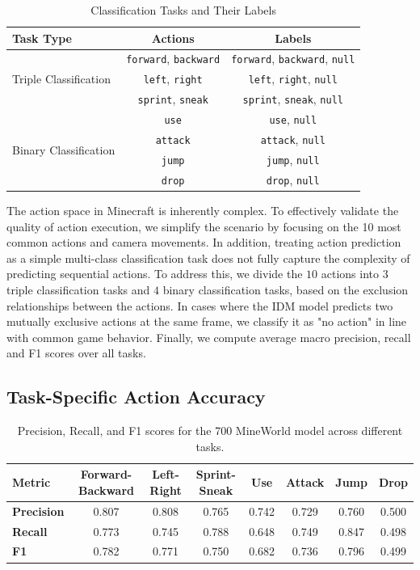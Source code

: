 \documentclass{article} %
\begin{document}
\begin{table}[htbp]
\centering
\caption{Classification Tasks and Their Labels}
\begin{tabular}{ l|c|c }
\toprule[1pt]
\textbf{Task Type} & \textbf{Actions} & \textbf{Labels} \\
\midrule
\multirow{3}{*}{Triple Classification} & \texttt{forward}, \texttt{backward} & \texttt{forward}, \texttt{backward}, \texttt{null} \\
& \texttt{left}, \texttt{right} & \texttt{left}, \texttt{right}, \texttt{null} \\
& \texttt{sprint}, \texttt{sneak} & \texttt{sprint}, \texttt{sneak}, \texttt{null} \\
\midrule
\multirow{4}{*}{Binary Classification} & \texttt{use} & \texttt{use}, \texttt{null} \\
& \texttt{attack} & \texttt{attack}, \texttt{null} \\
& \texttt{jump} & \texttt{jump}, \texttt{null} \\
& \texttt{drop} & \texttt{drop}, \texttt{null} \\
\bottomrule
\end{tabular}
\label{tab:subtask}
\end{table}

The action space in Minecraft is inherently complex. To effectively validate the quality of action execution, we simplify the scenario by focusing on the 10 most common actions and camera movements.
In addition, treating action prediction as a simple multi-class classification task does not fully capture the complexity of predicting sequential actions. To address this, we divide the $10$ actions into $3$ triple classification tasks and $4$ binary classification tasks, based on the exclusion relationships between the actions. In cases where the IDM model predicts two mutually exclusive actions at the same frame, we classify it as "no action" in line with common game behavior. Finally, we compute average macro precision, recall and F1 scores over all tasks. 



\subsection{Task-Specific Action Accuracy}

\begin{table}[htbp]
\centering
\caption{Precision, Recall, and F1 scores for the 700 MineWorld model across different tasks.}
\begin{tabular}{ l|c|c|c|c|c|c|c }
\toprule[1pt]
\textbf{Metric} & \textbf{Forward-Backward} & \textbf{Left-Right} & \textbf{Sprint-Sneak} & \textbf{Use} & \textbf{Attack} & \textbf{Jump} & \textbf{Drop} \\
\midrule
\textbf{Precision} & 0.807 & 0.808 & 0.765 & 0.742 & 0.729 & 0.760 & 0.500 \\
\textbf{Recall} & 0.773 & 0.745 & 0.788 & 0.648 & 0.749 & 0.847 & 0.498 \\
\textbf{F1} & 0.782 & 0.771 & 0.750 & 0.682 & 0.736 & 0.796 & 0.499 \\
\bottomrule
\end{tabular}
\label{tab:specific_prf}
\end{table}
\end{document}
